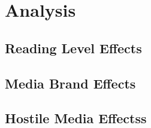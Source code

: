 \chapter{Analysis}

\section{Reading Level Effects}

\section{Media Brand Effects}

\section{Hostile Media Effectss}
 




 

 






